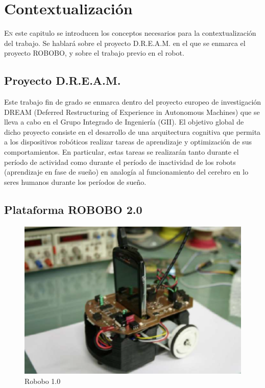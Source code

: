 \chapter{Contextualización}
\label{chap:contextualizacion}
\vspace{0.5cm}


\lettrine{E}{n} este capitulo se introducen los conceptos necesarios para la contextualización del trabajo. Se hablará sobre el proyecto D.R.E.A.M.\cite{dream_project} en el que se enmarca el proyecto ROBOBO, y sobre el trabajo previo en el robot.


\section{Proyecto D.R.E.A.M.}
\label{sec:dreamproyect}
Este trabajo fin de grado se enmarca dentro del proyecto europeo de investigación DREAM (Deferred Restructuring of Experience in Autonomous Machines) que se lleva a cabo en el Grupo Integrado de Ingeniería (GII). El objetivo global de dicho proyecto consiste en el desarrollo de una arquitectura cognitiva que permita a los dispositivos robóticos realizar tareas de aprendizaje y optimización de sus comportamientos. En particular, estas tareas se realizarán tanto durante el período de actividad como durante el período de inactividad de los robots (aprendizaje en fase de sueño) en analogía al funcionamiento del cerebro en lo seres humanos durante los períodos de sueño.

\section{Plataforma ROBOBO 2.0}
\label{sec:roboboplatform}

\begin{figure}
	\centering
	\includegraphics[width=0.8\linewidth]{imagenes/robobo1_0.PNG}
	\caption{Robobo 1.0}
	\label{fig:robobo_1_0}
\end{figure}

